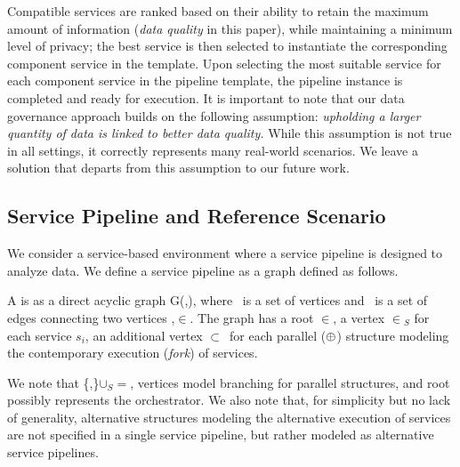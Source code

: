 Compatible services are ranked based on their ability to retain the maximum amount of information (\emph{data quality} in this paper), while maintaining a minimum level of privacy; the best service is then selected to instantiate the corresponding component service in the template.
Upon selecting the most suitable service for each component service in the pipeline template, the pipeline instance is completed and ready for execution.
It is important to note that our data governance approach builds on the following assumption: \emph{upholding a larger quantity of data is linked to better data quality.}
While this assumption is not true in all settings, it correctly represents many real-world scenarios. We leave a solution that departs from this assumption to our future work.

\subsection{Service Pipeline and Reference Scenario}\label{sec:service_definition}
We consider a service-based environment where a service pipeline is designed to analyze data.
We define a service pipeline as a graph defined as follows. %
\begin{definition}[\pipeline]\label{def:pipeline}
  A \pipeline is as a direct acyclic graph G(\V,\E), where \V\ is a set of vertices and \E\ is a set of edges connecting two vertices ,$\in$\V.
  The graph has a root $\in$\V, a vertex $\in$\V$_S$ for each service $s_i$, an additional vertex $\subset$\V\ for each parallel ($\oplus$) structure modeling the contemporary execution (\emph{fork}) of services.
\end{definition}

We note that \{,\}$\cup$\V$_S$$=$\V, vertices  model branching for parallel structures, and root  possibly represents the orchestrator. We also note that, for simplicity but no lack of generality, alternative structures modeling the alternative execution of services are not specified in a single service pipeline, but rather modeled as alternative service pipelines.

